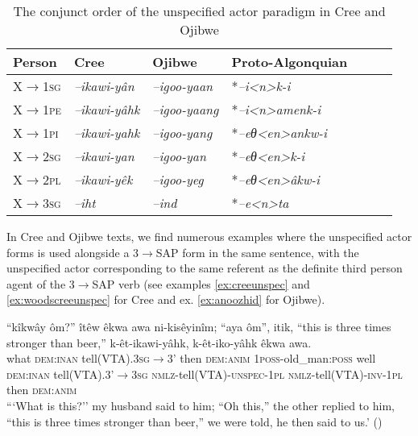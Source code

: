 \documentclass[twoside,a4paper,11pt]{article}
\newcommand{\ipa}[1]{{\phon\textit{#1}}}
\newcommand{\sg}{\textsc{sg}}
\newcommand{\pl}{\textsc{pl}}
\newcommand{\grise}[1]{\cellcolor{lightgray}\textbf{#1}}
\newcommand{\Σ}{\greek{Σ}}
\newcommand{\anim}{\textsc{anim}}
\newcommand{\dem}{\textsc{dem}}
\newcommand{\inan}{\textsc{inan}}
\newcommand{\inv}{\textsc{inv}}
\newcommand{\nmlz}{\textsc{nmlz}}
\newcommand{\pli}{\textsc{pi}}
\newcommand{\pe}{\textsc{pe}}
\newcommand{\poss}{\textsc{poss}}
\newcommand{\unspec}{\textsc{unspec}}
\begin{document}
\begin{table}[htbp]
\caption{The conjunct order of the unspecified actor paradigm in Cree and Ojibwe} \label{tab:unspec} \centering
\begin{tabular}{lllllll}
\toprule
Person &   Cree & Ojibwe      &Proto-Algonquian\\
\midrule
X$\rightarrow$1\sg& \ipa{--ikawi-yân} \grise{} &\ipa{--igoo-yaan} \grise{}  & *\ipa{--i<n>k-i} \\
X$\rightarrow$1\pe & \ipa{--ikawi-yâhk} \grise{}   &\ipa{--igoo-yaang} \grise{}  & *\ipa{--i<n>amenk-i} \\
X$\rightarrow$1\pli & \ipa{--ikawi-yahk} \grise{}  &\ipa{--igoo-yang} \grise{}  & *\ipa{--eθ<en>ankw-i} \\
\midrule
X$\rightarrow$2\sg& \ipa{--ikawi-yan} \grise{} &\ipa{--igoo-yan} \grise{}  & *\ipa{--eθ<en>k-i} \\
X$\rightarrow$2\pl& \ipa{--ikawi-yêk} \grise{} &\ipa{--igoo-yeg} \grise{}  & *\ipa{--eθ<en>âkw-i}  \\
\midrule
X$\rightarrow$3\sg& \ipa{--iht}   &\ipa{--ind}  & *\ipa{--e<n>ta} \\
\bottomrule
\end{tabular}
\end{table}

In Cree and Ojibwe texts, we find numerous examples where the unspecified actor forms is used alongside a 3$\rightarrow$SAP form in the same sentence, with the unspecified actor corresponding to the same referent as  the definite third person agent of the 3$\rightarrow$SAP verb (see examples \ref{ex:creeunspec} and \ref{ex:woodscreeunspec} for Cree and ex. \ref{ex:anoozhid} for Ojibwe).


\begin{exe}
 \ex \label{ex:creeunspec}
\gll ``kîkwây ôm?'' îtêw êkwa awa ni-kisêyinîm; ``aya ôm'', itik, {\rm``this is three times stronger than beer,''} k-êt-ikawi-yâhk, k-êt-iko-yâhk êkwa awa.\\
what {\dem{:}\inan} {tell(VTA).3\sg$\rightarrow$3'} then {\dem{:}\anim} {1\poss-old\_man{:}\poss} well {\dem{:}\inan} {tell(VTA).3'$\rightarrow$3\sg} {} {\nmlz-tell(VTA)-\unspec-1\pl} {\nmlz-tell(VTA)-\inv-1\pl} then {\dem{:}\anim}\\
\glt ```What is this?'' my husband said to him; ``Oh this,'' the other replied to him, ``this is three times stronger than beer,'' we were told, he then said to us.' (\citealp[p. 57]{bothsides})
\end{exe}
\end{document}
